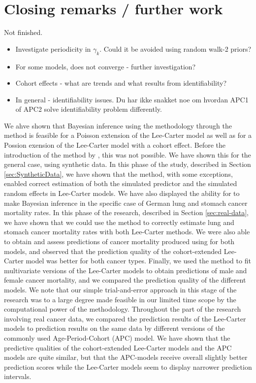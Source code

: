 \section{Closing remarks / further work}
\label{sec:closingRemarks}
\textcolor{myDarkBlue}{Not finished.}
\begin{itemize}
    \item Investigate periodicity in $\gamma_k$. Could it be avoided using random walk-2 priors? 
    \item For some models, \inlabru does not converge - further investigation? 
    \item Cohort effects - what are trends and what results from identifiability? 
    
    \item In general - identifiability issues. Du har ikke snakket noe om hvordan APC1 of APC2 solve identifiability problem differently. 
\end{itemize}
We ahve shown that Bayesian inference using the \INLA methodology through the \inlabru method is feasible for a Poisson extension of the Lee-Carter model as well as for a Possion exension of the Lee-Carter model with a cohort effect. Before the introduction of the \inlabru method by \textcite{BachlLindgren2019}, this was not possible. We have shown this for the general case, using synthetic data. In this phase of the study, described in Section \ref{sec:SyntheticData}, we have shown that the \inlabru method, with some exceptions, enabled correct estimation of both the simulated predictor and the simulated random effects in Lee-Carter models. We have also displayed the ability for \inlabru to make Bayesian inference in the specific case of German lung and stomach cancer mortality rates. In this phase of the research, described in Section \ref{sec:real-data}, we have shown that we could use the \inlabru method to correctly estimate lung and stomach cancer mortality rates with both Lee-Carter methods. We were also able to obtain and assess predictions of cancer mortality produced using \inlabru for both models, and observed that the prediction quality of the cohort-extended Lee-Carter model was better for both cancer types. Finally, we used the \inlabru method to fit multivariate versions of the Lee-Carter models to obtain predictions of male and female cancer mortality, and we compared the prediction quality of the different models. We note that our simple trial-and-error approach in this stage of the research was to a large degree made feasible in our limited time scope by the computational power of the \inla methodology. Throughout the part of the research involving real cancer data, we compared the prediction results of the Lee-Carter models to prediction results on the same data by different versions of the commonly used Age-Period-Cohort (APC) model. We have shown that the predictive qualities of the cohort-extended Lee-Carter models and the APC models are quite similar, but that the APC-models receive overall slightly better prediction scores while the Lee-Carter models seem to display narrower prediction intervals.     

